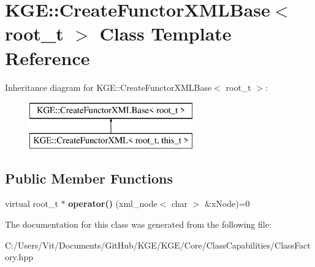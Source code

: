 \hypertarget{class_k_g_e_1_1_create_functor_x_m_l_base}{\section{K\-G\-E\-:\-:Create\-Functor\-X\-M\-L\-Base$<$ root\-\_\-t $>$ Class Template Reference}
\label{class_k_g_e_1_1_create_functor_x_m_l_base}
}
Inheritance diagram for K\-G\-E\-:\-:Create\-Functor\-X\-M\-L\-Base$<$ root\-\_\-t $>$\-:\begin{figure}[H]
\begin{center}
\leavevmode
\includegraphics[height=2.000000cm]{class_k_g_e_1_1_create_functor_x_m_l_base}
\end{center}
\end{figure}
\subsection*{Public Member Functions}
\begin{DoxyCompactItemize}
\item 
\hypertarget{class_k_g_e_1_1_create_functor_x_m_l_base_ae974454b91daa10123929a292bc5c8ee}{virtual root\-\_\-t $\ast$ {\bfseries operator()} (xml\-\_\-node$<$ char $>$ \&x\-Node)=0}\label{class_k_g_e_1_1_create_functor_x_m_l_base_ae974454b91daa10123929a292bc5c8ee}

\end{DoxyCompactItemize}


The documentation for this class was generated from the following file\-:\begin{DoxyCompactItemize}
\item 
C\-:/\-Users/\-Vit/\-Documents/\-Git\-Hub/\-K\-G\-E/\-K\-G\-E/\-Core/\-Class\-Capabilities/Class\-Factory.\-hpp\end{DoxyCompactItemize}
